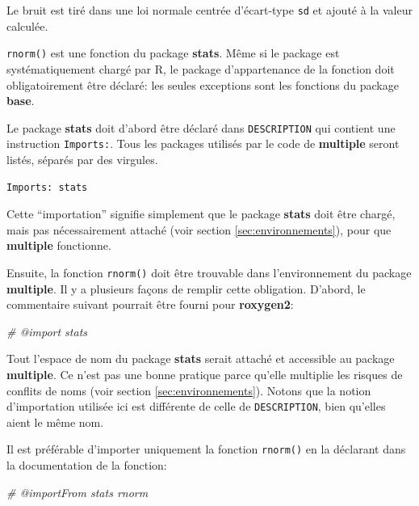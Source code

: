 \documentclass[
  12pt,
  french,
  a4paper,
  extrafontsizes,onecolumn,openright
  ]{memoir}
\newenvironment{Shaded}{\begin{snugshade}}{\end{snugshade}}
\newcommand{\CommentTok}[1]{\textcolor[rgb]{0.56,0.35,0.01}{\textit{#1}}}
\begin{document}
\normalsize

Le bruit est tiré dans une loi normale centrée d'écart-type \texttt{sd} et ajouté à la valeur calculée.

\texttt{rnorm()} est une fonction du package \textbf{stats}.
Même si le package est systématiquement chargé par R, le package d'appartenance de la fonction doit obligatoirement être déclaré: les seules exceptions sont les fonctions du package \textbf{base}.

Le package \textbf{stats} doit d'abord être déclaré dans \texttt{DESCRIPTION} qui contient une instruction \texttt{Imports:}.
Tous les packages utilisés par le code de \textbf{multiple} seront listés, séparés par des virgules.

\begin{verbatim}
Imports: stats
\end{verbatim}

Cette \enquote{importation} signifie simplement que le package \textbf{stats} doit être chargé, mais pas nécessairement attaché (voir section \ref{sec:environnements}), pour que \textbf{multiple} fonctionne.

Ensuite, la fonction \texttt{rnorm()} doit être trouvable dans l'environnement du package \textbf{multiple}.
Il y a plusieurs façons de remplir cette obligation.
D'abord, le commentaire suivant pourrait être fourni pour \textbf{roxygen2}:

\scriptsize

\begin{Shaded}
\begin{Highlighting}[]
\CommentTok{\#\textquotesingle{} @import stats}
\end{Highlighting}
\end{Shaded}

\normalsize

Tout l'espace de nom du package \textbf{stats} serait attaché et accessible au package \textbf{multiple}.
Ce n'est pas une bonne pratique parce qu'elle multiplie les risques de conflits de noms (voir section \ref{sec:environnements}).
Notons que la notion d'importation utilisée ici est différente de celle de \texttt{DESCRIPTION}, bien qu'elles aient le même nom.

Il est préférable d'importer uniquement la fonction \texttt{rnorm()} en la déclarant dans la documentation de la fonction:

\scriptsize

\begin{Shaded}
\begin{Highlighting}[]
\CommentTok{\#\textquotesingle{} @importFrom stats rnorm}
\end{Highlighting}
\end{Shaded}
\end{document}

